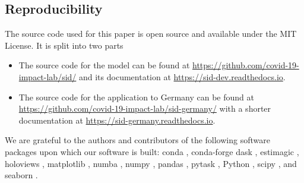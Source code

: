 \subsection{Reproducibility}
\label{subsec:code}

The source code used for this paper is open source and available under the MIT License.
It is split into two parts
\begin{itemize}
    \item The source code for the model can be found at
   \href{https://github.com/covid-19-impact-lab/sid/}{https://github.com/covid-19-impact-lab/sid/}
   and its documentation at
   \href{https://sid-dev.readthedocs.io}{https://sid-dev.readthedocs.io}.
   \item The source code for the application to Germany can be found at
   \href{https://github.com/covid-19-impact-lab/sid-germany/}{https://github.com/covid-19-impact-lab/sid-germany/}
   with a shorter documentation at
   \href{https://sid-germany.readthedocs.io}{https://sid-germany.readthedocs.io}.
\end{itemize} 

We are grateful to the authors and contributors of the following software packages upon
which our software is built: conda \cite{Anaconda2016}, conda-forge
\cite{CondaForge2015} dask \cite{Rocklin2015}, estimagic \cite{Gabler2020a}, holoviews
\cite{Stevens2015}, matplotlib \cite{Hunter2007}, numba \cite{Lam2015}, numpy
\cite{Harris2020}, pandas \cite{Reback2020,McKinney2010}, pytask \cite{Raabe2020},
Python \cite{VanRossum1995}, scipy \cite{Virtanen2020}, and seaborn \cite{Waskom2021}.
